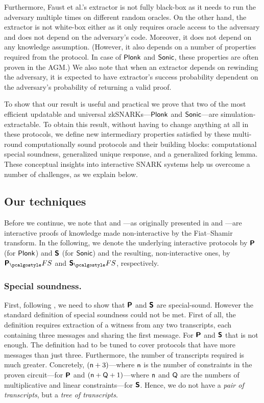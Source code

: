 \documentclass[runningheads,11pt]{llncs}
\begin{document}
Furthermore, Faust et al.'s extractor is not fully black-box as it needs to run
the adversary multiple times on different random oracles. On the other hand, the
extractor is not white-box either as it only requires oracle access to the
adversary and does not depend on the adversary's code. Moreover, it does not
depend on any knowledge assumption.  (However, it also depends on a number of
properties required from the protocol. In case of $\textnormal{\textsf{Plonk}}$ and ${\textnormal{\textsf{Sonic}}}$, these
properties are often proven in the AGM.) We also note that when an extractor
depends on rewinding the adversary, it is expected to have extractor's success
probability dependent on the adversary's probability of returning a valid proof.

To show that our result is useful and practical we prove that two of the most
efficient updatable and universal zkSNARKs---$\textnormal{\textsf{Plonk}}$ and ${\textnormal{\textsf{Sonic}}}$---are
simulation-extractable. To obtain this result, without having to change anything
at all in these protocols, we define new intermediary properties satisfied by
these multi-round computationally sound protocols and their building blocks:
computational special soundness, generalized unique response, and a generalized
forking lemma. These conceptual insights into interactive SNARK systems help us
overcome a number of challenges, as we explain below.

\subsection{Our techniques}

Before we continue, we note that \plonk{} and \sonic{}---as originally presented
in \cite{EPRINT:GabWilCio19} and \cite{CCS:MBKM19}---are interactive proofs of
knowledge made non-interactive by the Fiat--Shamir transform. In the following,
we denote the underlying interactive protocols by $\bm{\mathsf{P}}$ (for $\textnormal{\textsf{Plonk}}$)
and $\bm{\mathsf{S}}$ (for ${\textnormal{\textsf{Sonic}}}$) and the resulting, non-interactive ones, by
$\plonkprotfs$ and $\sonicprotfs$, respectively.

\subsubsection{Special soundness.} 
First, following \cite{INDOCRYPT:FKMV12}, we need to show that $\bm{\mathsf{P}}$ and
$\bm{\mathsf{S}}$ are special-sound. However the standard definition of special
soundness could not be met. First of all, the definition requires extraction of
a witness from any two transcripts, each containing three messages and sharing
the first message. For $\bm{\mathsf{P}}$ and $\bm{\mathsf{S}}$ that is not enough. The
definition had to be tuned to cover protocols that have more messages than just
three. Furthermore, the number of transcripts required is much
greater. Concretely, $(\mathsf{n} + 3)$---where $\mathsf{n}$ is the
number of constraints in the proven circuit---for $\bm{\mathsf{P}}$ and $(\mathsf{n}
+ \mathsf{Q} + 1)$---where $\mathsf{n}$ and $\mathsf{Q}$ are the numbers of
multiplicative and linear constraints---for $\bm{\mathsf{S}}$. Hence, we do not have
a \emph{pair of transcripts}, but a \emph{tree of transcripts}.
\end{document}
